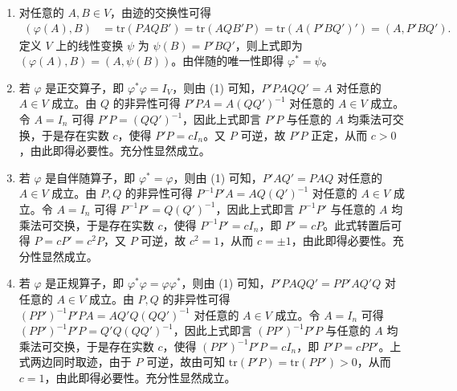 \documentclass[../../main.tex]{subfiles}
\begin{document}
\begin{solution}
\begin{enumerate}[(1)]
\item 对任意的 \(A,B\in V\)，由迹的交换性可得
\begin{align*}
(\varphi(A),B)&=\mathrm{tr}(PAQB')=\mathrm{tr}(AQB'P)=\mathrm{tr}(A(P'BQ')')=(A,P'BQ').
\end{align*}
定义 \(V\) 上的线性变换 \(\psi\) 为 \(\psi(B)=P'BQ'\)，则上式即为 \((\varphi(A),B)=(A,\psi(B))\)。由伴随的唯一性即得 \(\varphi^* = \psi\)。
\item 若 \(\varphi\) 是正交算子，即 \(\varphi^*\varphi = I_V\)，则由 (1) 可知，\(P'PAQQ' = A\) 对任意的 \(A\in V\) 成立。由 \(Q\) 的非异性可得 \(P'PA = A(QQ')^{-1}\) 对任意的 \(A\in V\) 成立。令 \(A = I_n\) 可得 \(P'P=(QQ')^{-1}\)，因此上式即言 \(P'P\) 与任意的 \(A\) 均乘法可交换，于是存在实数 \(c\)，使得 \(P'P = cI_n\)。又 \(P\) 可逆，故 \(P'P\) 正定，从而 \(c > 0\)，由此即得必要性。充分性显然成立。
\item 若 \(\varphi\) 是自伴随算子，即 \(\varphi^* = \varphi\)，则由 (1) 可知，\(P'AQ' = PAQ\) 对任意的 \(A\in V\) 成立。由 \(P,Q\) 的非异性可得 \(P^{-1}P'A = AQ(Q')^{-1}\) 对任意的 \(A\in V\) 成立。令 \(A = I_n\) 可得 \(P^{-1}P' = Q(Q')^{-1}\)，因此上式即言 \(P^{-1}P'\) 与任意的 \(A\) 均乘法可交换，于是存在实数 \(c\)，使得 \(P^{-1}P' = cI_n\)，即 \(P' = cP\)。此式转置后可得 \(P = cP' = c^2P\)，又 \(P\) 可逆，故 \(c^2 = 1\)，从而 \(c = \pm1\)，由此即得必要性。充分性显然成立。 
\item 若 \(\varphi\) 是正规算子，即 \(\varphi^*\varphi = \varphi\varphi^*\)，则由 (1) 可知，\(P'PAQQ' = PP'AQ'Q\) 对任意的 \(A\in V\) 成立。由 \(P,Q\) 的非异性可得 \((PP')^{-1}P'PA = AQ'Q(QQ')^{-1}\) 对任意的 \(A\in V\) 成立。令 \(A = I_n\) 可得 \((PP')^{-1}P'P = Q'Q(QQ')^{-1}\)，因此上式即言 \((PP')^{-1}P'P\) 与任意的 \(A\) 均乘法可交换，于是存在实数 \(c\)，使得 \((PP')^{-1}P'P = cI_n\)，即 \(P'P = cPP'\)。上式两边同时取迹，由于 \(P\) 可逆，故由可知 \(\mathrm{tr}(P'P)=\mathrm{tr}(PP') > 0\)，从而 \(c = 1\)，由此即得必要性。充分性显然成立。 
\end{enumerate} 
\end{solution}
\end{document}
